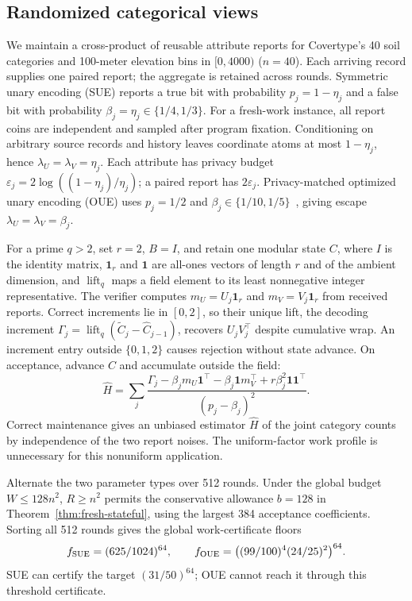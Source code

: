 \subsection{Randomized categorical views}
\label{sec:randomized_categorical_application}
We maintain a cross-product of reusable attribute reports for Covertype's
40 soil categories and 100-meter elevation bins in $[0,4000)$ ($n=40$).
Each arriving record supplies one paired report; the aggregate is retained
across rounds.
Symmetric unary encoding (SUE) reports a true bit with probability
$p_j=1-\eta_j$ and a false bit with probability
$\beta_j=\eta_j\in\{1/4,1/3\}$.
For a fresh-work instance, all report coins are independent and sampled
after program fixation. Conditioning on arbitrary source records and
history leaves coordinate atoms at most $1-\eta_j$, hence
$\lambda_U=\lambda_V=\eta_j$. Each attribute has privacy budget
$\varepsilon_j=2\log((1-\eta_j)/\eta_j)$; a paired report has
$2\varepsilon_j$. Privacy-matched optimized unary encoding (OUE) uses
$p_j=1/2$ and $\beta_j\in\{1/10,1/5\}$~\cite{wang2017local},
giving escape $\lambda_U=\lambda_V=\beta_j$.

For a prime $q>2$, set $r=2$, $B=I$, and retain one modular state $C$, where $I$ is the
identity matrix, $\mathbf1_r$ and $\mathbf1$ are all-ones vectors of length
$r$ and of the ambient dimension, and $\operatorname{lift}_q$ maps a field
element to its least nonnegative integer representative. The verifier
computes $m_U=U_j\mathbf1_r$ and $m_V=V_j\mathbf1_r$ from received
reports. Correct increments lie in $[0,2]$, so their unique lift,
the decoding increment
$\Gamma_j=\operatorname{lift}_q(\widetilde C_j-\widehat C_{j-1})$,
recovers $U_jV_j^\top$ despite cumulative wrap. An increment entry outside
$\{0,1,2\}$ causes rejection without state advance. On acceptance, advance
$C$ and accumulate outside the field:
\[
 \widehat H=\sum_j
 \frac{\Gamma_j-\beta_jm_U\mathbf1^\top-\beta_j\mathbf1m_V^\top
                   +r\beta_j^2\mathbf1\mathbf1^\top}{(p_j-\beta_j)^2}.
\]
Correct maintenance gives an unbiased estimator $\widehat H$ of the joint
category counts by independence of the two report noises. The uniform-factor work profile is unnecessary
for this nonuniform application.

Alternate the two parameter types over 512 rounds. Under the global
budget $W\le128n^2$, $R\ge n^2$ permits the conservative allowance
$b=128$ in Theorem~\ref{thm:fresh-stateful}, using the largest
384 acceptance coefficients. Sorting all 512 rounds gives the global
work-certificate floors
\[
 f_{\rm SUE}=(625/1024)^{64},\qquad
 f_{\rm OUE}=\bigl((99/100)^4(24/25)^2\bigr)^{64}.
\]
SUE can certify the target $(31/50)^{64}$; OUE cannot reach it through
this threshold certificate.

